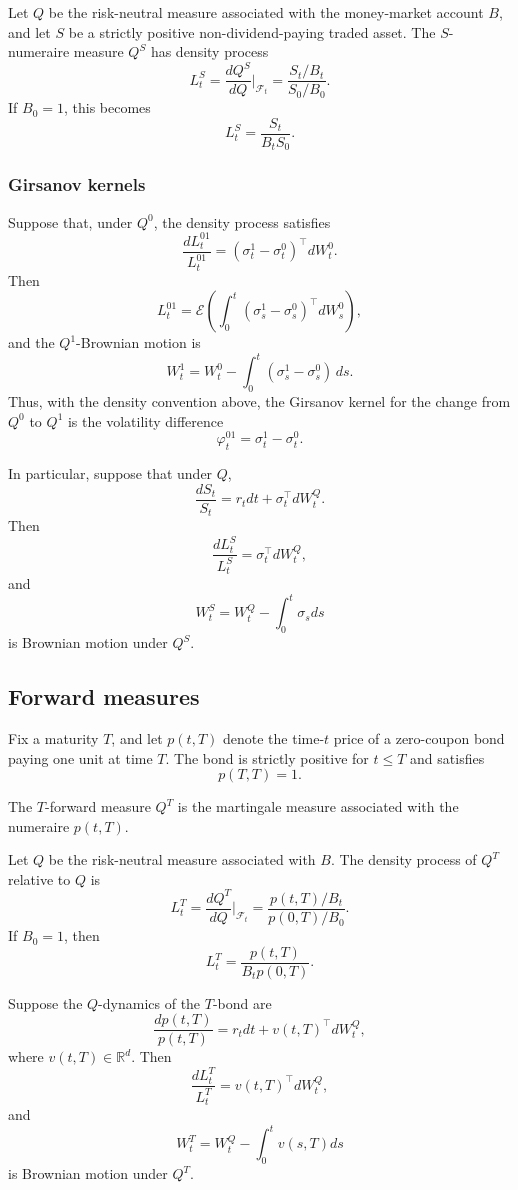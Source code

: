 \begin{cor}
Let $Q$ be the risk-neutral measure associated with the money-market account $B$, and let $S$ be a strictly positive non-dividend-paying traded asset. The $S$-numeraire measure $Q^S$ has density process
\[
L_t^S
=\frac{dQ^S}{dQ}\bigg|_{\mathcal{F}_t}
=\frac{S_t/B_t}{S_0/B_0}.
\]
If $B_0=1$, this becomes
\[
L_t^S=\frac{S_t}{B_tS_0}.
\]
\end{cor}

\subsubsection*{Girsanov kernels}

Suppose that, under $Q^0$, the density process satisfies
\[
\frac{dL_t^{01}}{L_t^{01}}
=(\sigma_t^1-\sigma_t^0)^\top dW_t^0.
\]
Then
\[
L_t^{01}
=\mathcal{E}\!\left(
 \int_0^t(\sigma_s^1-\sigma_s^0)^\top dW_s^0
\right),
\]
and the $Q^1$-Brownian motion is
\[
W_t^1
=W_t^0-
 \int_0^t(\sigma_s^1-\sigma_s^0)\,ds.
\]
Thus, with the density convention above, the Girsanov kernel for the change from $Q^0$ to $Q^1$ is the volatility difference
\[
\varphi_t^{01}=\sigma_t^1-\sigma_t^0.
\]

In particular, suppose that under $Q$,
\[
\frac{dS_t}{S_t}=r_tdt+\sigma_t^\top dW_t^Q.
\]
Then
\[
\frac{dL_t^S}{L_t^S}=\sigma_t^\top dW_t^Q,
\]
and
\[
W_t^S=W_t^Q-\int_0^t\sigma_sds
\]
is Brownian motion under $Q^S$.

\subsection{Forward measures}

Fix a maturity $T$, and let $p(t,T)$ denote the time-$t$ price of a zero-coupon bond paying one unit at time $T$. The bond is strictly positive for $t\leq T$ and satisfies
\[
p(T,T)=1.
\]

\begin{de}
The $T$-forward measure $Q^T$ is the martingale measure associated with the numeraire $p(t,T)$.
\end{de}

\begin{prop}
Let $Q$ be the risk-neutral measure associated with $B$. The density process of $Q^T$ relative to $Q$ is
\[
L_t^T
=\frac{dQ^T}{dQ}\bigg|_{\mathcal{F}_t}
=\frac{p(t,T)/B_t}{p(0,T)/B_0}.
\]
If $B_0=1$, then
\[
L_t^T=\frac{p(t,T)}{B_tp(0,T)}.
\]

Suppose the $Q$-dynamics of the $T$-bond are
\[
\frac{dp(t,T)}{p(t,T)}
=r_tdt+v(t,T)^\top dW_t^Q,
\]
where $v(t,T)\in\mathbb{R}^d$. Then
\[
\frac{dL_t^T}{L_t^T}
=v(t,T)^\top dW_t^Q,
\]
and
\[
W_t^T
=W_t^Q-\int_0^tv(s,T)ds
\]
is Brownian motion under $Q^T$.
\end{prop}

